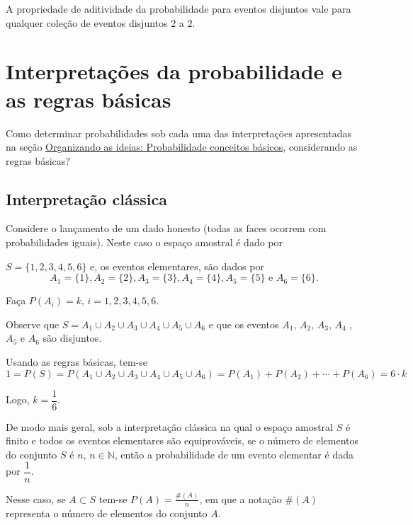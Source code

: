 A propriedade de aditividade da probabilidade para eventos disjuntos vale para qualquer coleção de eventos disjuntos $2$ a $2$.


\section{Interpretações da probabilidade e as regras básicas}

Como determinar probabilidades sob cada uma das interpretações apresentadas na seção \hyperref[organizandoconceitosbasicos]{Organizando as ideias: Probabilidade \textendash{} conceitos básicos}, considerando as regras básicas?

\subsection{Interpretação clássica}

\begin{example}{}

Considere o lançamento de um dado honesto (todas as faces ocorrem com probabilidades iguais). Neste caso o espaço amostral é dado por

\(S=\{ 1,2,3,4,5,6\}\) e, os eventos elementares, são dados por
$$A_1=\{1\}, A_2=\{2\}, A_3=\{3\}, A_4=\{4\}, A_5=\{5\} \text{ e } A_6=\{6\}.$$

Faça \(P(A_i)=k\), \(i=1,2,3,4,5,6\).

Observe que \(S=A_1\cup A_2\cup A_3\cup A_4\cup A_5 \cup A_6\) e que os eventos \(A_1\), \(A_2\), \(A_3\), \(A_4\) , \(A_5\) e \(A_6\) são disjuntos.

Usando as regras básicas, tem-se
$$1=P(S)=P(A_1\cup A_2\cup A_3\cup A_4\cup A_5 \cup A_6)=P(A_1)+P(A_2)+\cdots +P(A_6)=6\cdot k$$

Logo, \(k=\dfrac{1}{6}\).
\end{example}

De modo mais geral, sob a interpretação clássica na qual o espaço amostral \(S\) é finito e todos os eventos elementares são equiprováveis, se o número de elementos do conjunto \(S\) é \(n\), \(n\in \mathbb{N}\), então a probabilidade de um evento elementar é dada por \(\dfrac{1}{n}\).

Nesse caso, se \(A\subset S\) tem-se $\displaystyle{P(A)=\frac{\#(A)}{n}}$, em que a notação \(\#(A)\) representa o número de elementos do conjunto \(A\).

